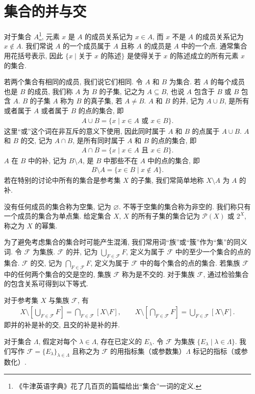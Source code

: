\documentclass[../../main.tex]{subfiles}
\begin{document}
\section{集合的并与交}\label{section:ch00-集合并交}

对于集合 $A$\footnote{《牛津英语字典》花了几百页的篇幅给出“集合”一词的定义.}, 元素 $x$ 是 $A$ 的成员关系记为 $x\in A$, 而 $x$ 不是 $A$ 的成员关系记为 $x\notin A$. 我们常说 $A$ 的一个成员属于 $A$ 且称 $A$ 的成员是 $A$ 中的一个点. 通常集合用花括号表示, 因此 $\{x\mid\text{关于 }x\text{ 的陈述}\}$ 是使得关于 $x$ 的陈述成立的所有元素 $x$ 的集合.

若两个集合有相同的成员, 我们说它们相同. 令 $A$ 和 $B$ 为集合. 若 $A$ 的每个成员也是 $B$ 的成员, 我们称 $A$ 为 $B$ 的子集, 记之为 $A\subseteq B$, 也说 $A$ 包含于 $B$ 或 $B$ 包含 $A$. $B$ 的子集 $A$ 称为 $B$ 的真子集, 若 $A\neq B$. $A$ 和 $B$ 的并, 记为 $A\cup B$, 是所有或者属于 $A$ 或者属于 $B$ 的点的集合, 即
\begin{align*}
A\cup B=\{x\mid x\in A\text{ 或 }x\in B\}.
\end{align*}
这里“或”这个词在非互斥的意义下使用, 因此同时属于 $A$ 和 $B$ 的点属于 $A\cup B$. $A$ 和 $B$ 的交, 记为 $A\cap B$, 是所有同时属于 $A$ 和 $B$ 的点的集合, 即
\begin{align*}
A\cap B=\{x\mid x\in A\text{ 且 }x\in B\}.
\end{align*}
$A$ 在 $B$ 中的补, 记为 $B\setminus A$, 是 $B$ 中那些不在 $A$ 中的点的集合, 即
\begin{align*}
B\setminus A=\{x\in B\mid x\notin A\}.
\end{align*}
若在特别的讨论中所有的集合是参考集 $X$ 的子集, 我们常简单地称 $X\setminus A$ 为 $A$ 的补.

没有任何成员的集合称为空集, 记为 $\varnothing$. 不等于空集的集合称为非空的. 我们称只有一个成员的集合为单点集. 给定集合 $X$, $X$ 的所有子集的集合记为 $\mathcal{P}(X)$ 或 $2^{X}$, 称之为 $X$ 的幂集.

为了避免考虑集合的集合时可能产生混淆, 我们常用词“族”或“簇”作为“集”的同义词. 令 $\mathcal{F}$ 为集族. $\mathcal{F}$ 的并, 记为 $\bigcup_{F\in\mathcal{F}}F$, 定义为属于 $\mathcal{F}$ 中的至少一个集合的点的集合. $\mathcal{F}$ 的交, 记为 $\bigcap_{F\in\mathcal{F}}F$, 定义为属于 $\mathcal{F}$ 中的每个集合的点的集合. 若集族 $\mathcal{F}$ 中的任何两个集合的交是空的, 集族 $\mathcal{F}$ 称为是不交的. 对于集族 $\mathcal{F}$, 通过检验集合的包含关系可得到以下等式.

\begin{proposition}[De Morgan 等式]\label{proposition:ch00-demorgan}
对于参考集 $X$ 与集族 $\mathcal{F}$, 有
\begin{align*}
X\setminus\left[\bigcup_{F\in\mathcal{F}}F\right]=\bigcap_{F\in\mathcal{F}}[X\setminus F],\qquad
X\setminus\left[\bigcap_{F\in\mathcal{F}}F\right]=\bigcup_{F\in\mathcal{F}}[X\setminus F].
\end{align*}
即并的补是补的交, 且交的补是补的并.
\end{proposition}

对于集合 $\Lambda$, 假定对每个 $\lambda\in\Lambda$, 存在已定义的 $E_{\lambda}$. 令 $\mathcal{F}$ 为集族 $\{E_{\lambda}\mid\lambda\in\Lambda\}$. 我们写作 $\mathcal{F}=\{E_{\lambda}\}_{\lambda\in\Lambda}$ 且称之为 $\mathcal{F}$ 的用指标集（或参数集）$\Lambda$ 标记的指标（或参数化）.
\end{document}
